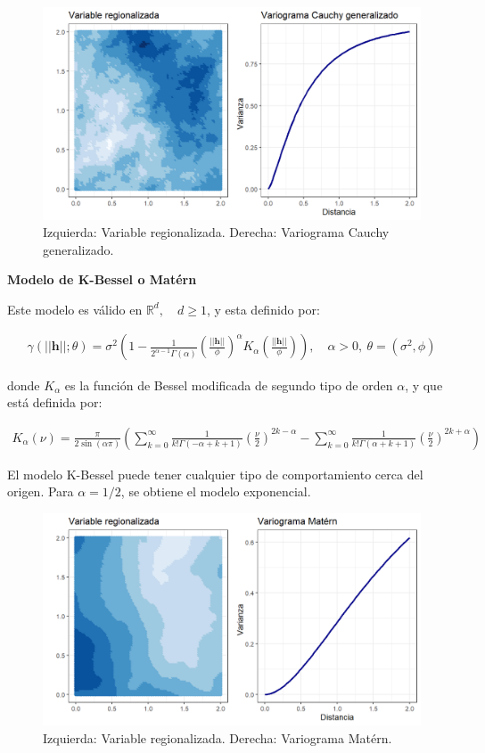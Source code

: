 \documentclass[
]{book}
\begin{document}
\begin{figure}
\includegraphics[width=17.78in]{figuras/otros/caugen_var} \caption{Izquierda: Variable regionalizada. Derecha: Variograma Cauchy generalizado.}\label{fig:caugenvar}
\end{figure}

\textbf{Modelo de K-Bessel o Matérn}

Este modelo es válido en \(\mathbb{R}^d,\quad d \geq 1\), y esta definido por:

\begin{align}
    \gamma(||\textbf{h}||;\theta)=\sigma^2\left(1-\frac{1}{2^{\alpha-1}\Gamma(\alpha)}\left(\frac{||\textbf{h}||}{\phi} \right)^\alpha K_\alpha \left(\frac{||\textbf{h}||}{\phi} \right) \right),\quad \alpha>0,\ \theta=(\sigma^2,\phi)
\end{align}

donde \(K_\alpha\) es la función de Bessel modificada de segundo tipo de orden \(\alpha\), y que está definida por:

\begin{align}
    K_\alpha (\nu) =\frac{\pi}{2\sin(\alpha \pi)}\left(\sum_{k=0}^\infty {\frac{1}{k!\Gamma(-\alpha+k+1)}\left(\frac{\nu}{2}\right)^{2k-\alpha}}-\sum_{k=0}^\infty {\frac{1}{k!\Gamma(\alpha+k+1)}\left(\frac{\nu}{2}\right)^{2k+\alpha}}\right)
\end{align}

El modelo K-Bessel puede tener cualquier tipo de comportamiento cerca del origen. Para \(\alpha=1/2\), se obtiene el modelo exponencial.

\begin{figure}
\includegraphics[width=17.78in]{figuras/otros/mat_var} \caption{Izquierda: Variable regionalizada. Derecha: Variograma Matérn.}\label{fig:matvar}
\end{figure}
\end{document}
